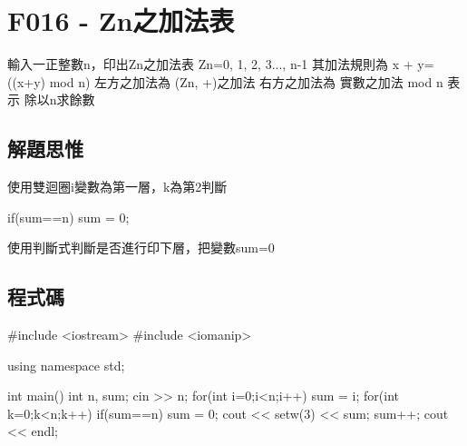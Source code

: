 \section{F016 - Zn之加法表}
輸入一正整數n，印出Zn之加法表 Zn={0, 1, 2, 3..., n-1} 其加法規則為 x + y= ((x+y) mod n) 左方之加法為 (Zn, +)之加法 右方之加法為 實數之加法 mod n 表示 除以n求餘數
\subsection{解題思惟}
使用雙迴圈i變數為第一層，k為第2判斷

\begin{inside}
	if(sum==n)
	{
		sum = 0;
	}
\end{inside}
使用判斷式判斷是否進行印下層，把變數sum=0
\subsection{程式碼}
\begin{cppcode}
#include <iostream>
#include <iomanip>

using namespace std;

int main()
{
	int n, sum;
	cin >> n;
	for(int i=0;i<n;i++)
	{
		sum = i;
		for(int k=0;k<n;k++)
		{
			if(sum==n)
			{
				sum = 0;
			}
			cout << setw(3) << sum;
			sum++;
		}
		cout << endl;
	}
}
\end{cppcode}
